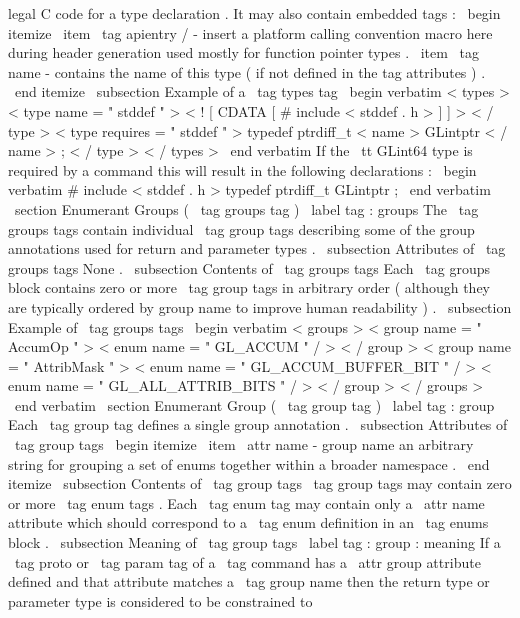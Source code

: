 legal
C
code
for
a
type
declaration
.
It
may
also
contain
embedded
tags
:
\
begin
{
itemize
}
\
item
\
tag
{
apientry
/
}
-
insert
a
platform
calling
convention
macro
here
during
header
generation
used
mostly
for
function
pointer
types
.
\
item
\
tag
{
name
}
-
contains
the
name
of
this
type
(
if
not
defined
in
the
tag
attributes
)
.
\
end
{
itemize
}
\
subsection
{
Example
of
a
\
tag
{
types
}
tag
}
\
begin
{
verbatim
}
<
types
>
<
type
name
=
"
stddef
"
>
<
!
[
CDATA
[
#
include
<
stddef
.
h
>
]
]
>
<
/
type
>
<
type
requires
=
"
stddef
"
>
typedef
ptrdiff_t
<
name
>
GLintptr
<
/
name
>
;
<
/
type
>
<
/
types
>
\
end
{
verbatim
}
If
the
{
\
tt
GLint64
}
type
is
required
by
a
command
this
will
result
in
the
following
declarations
:
\
begin
{
verbatim
}
#
include
<
stddef
.
h
>
typedef
ptrdiff_t
GLintptr
;
\
end
{
verbatim
}
\
section
{
Enumerant
Groups
(
\
tag
{
groups
}
tag
)
}
\
label
{
tag
:
groups
}
The
\
tag
{
groups
}
tags
contain
individual
\
tag
{
group
}
tags
describing
some
of
the
group
annotations
used
for
return
and
parameter
types
.
\
subsection
{
Attributes
of
\
tag
{
groups
}
tags
}
None
.
\
subsection
{
Contents
of
\
tag
{
groups
}
tags
}
Each
\
tag
{
groups
}
block
contains
zero
or
more
\
tag
{
group
}
tags
in
arbitrary
order
(
although
they
are
typically
ordered
by
group
name
to
improve
human
readability
)
.
\
subsection
{
Example
of
\
tag
{
groups
}
tags
}
\
begin
{
verbatim
}
<
groups
>
<
group
name
=
"
AccumOp
"
>
<
enum
name
=
"
GL_ACCUM
"
/
>
<
/
group
>
<
group
name
=
"
AttribMask
"
>
<
enum
name
=
"
GL_ACCUM_BUFFER_BIT
"
/
>
<
enum
name
=
"
GL_ALL_ATTRIB_BITS
"
/
>
<
/
group
>
<
/
groups
>
\
end
{
verbatim
}
\
section
{
Enumerant
Group
(
\
tag
{
group
}
tag
)
}
\
label
{
tag
:
group
}
Each
\
tag
{
group
}
tag
defines
a
single
group
annotation
.
\
subsection
{
Attributes
of
\
tag
{
group
}
tags
}
\
begin
{
itemize
}
\
item
\
attr
{
name
}
-
group
name
an
arbitrary
string
for
grouping
a
set
of
enums
together
within
a
broader
namespace
.
\
end
{
itemize
}
\
subsection
{
Contents
of
\
tag
{
group
}
tags
}
\
tag
{
group
}
tags
may
contain
zero
or
more
\
tag
{
enum
}
tags
.
Each
\
tag
{
enum
}
tag
may
contain
only
a
\
attr
{
name
}
attribute
which
should
correspond
to
a
\
tag
{
enum
}
definition
in
an
\
tag
{
enums
}
block
.
\
subsection
{
Meaning
of
\
tag
{
group
}
tags
}
\
label
{
tag
:
group
:
meaning
}
If
a
\
tag
{
proto
}
or
\
tag
{
param
}
tag
of
a
\
tag
{
command
}
has
a
\
attr
{
group
}
attribute
defined
and
that
attribute
matches
a
\
tag
{
group
}
name
then
the
return
type
or
parameter
type
is
considered
to
be
constrained
to
